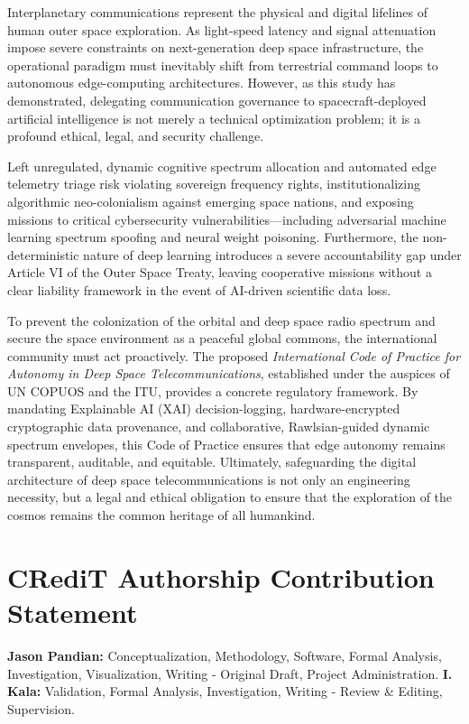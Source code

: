 \documentclass[final,5p,times,twocolumn]{elsarticle}
\begin{document}
Interplanetary communications represent the physical and digital lifelines of human outer space exploration. As light-speed latency and signal attenuation impose severe constraints on next-generation deep space infrastructure, the operational paradigm must inevitably shift from terrestrial command loops to autonomous edge-computing architectures. However, as this study has demonstrated, delegating communication governance to spacecraft-deployed artificial intelligence is not merely a technical optimization problem; it is a profound ethical, legal, and security challenge.

Left unregulated, dynamic cognitive spectrum allocation and automated edge telemetry triage risk violating sovereign frequency rights, institutionalizing algorithmic neo-colonialism against emerging space nations, and exposing missions to critical cybersecurity vulnerabilities—including adversarial machine learning spectrum spoofing and neural weight poisoning. Furthermore, the non-deterministic nature of deep learning introduces a severe accountability gap under Article VI of the Outer Space Treaty, leaving cooperative missions without a clear liability framework in the event of AI-driven scientific data loss.

To prevent the colonization of the orbital and deep space radio spectrum and secure the space environment as a peaceful global commons, the international community must act proactively. The proposed \textit{International Code of Practice for Autonomy in Deep Space Telecommunications}, established under the auspices of UN COPUOS and the ITU, provides a concrete regulatory framework. By mandating Explainable AI (XAI) decision-logging, hardware-encrypted cryptographic data provenance, and collaborative, Rawlsian-guided dynamic spectrum envelopes, this Code of Practice ensures that edge autonomy remains transparent, auditable, and equitable. Ultimately, safeguarding the digital architecture of deep space telecommunications is not only an engineering necessity, but a legal and ethical obligation to ensure that the exploration of the cosmos remains the common heritage of all humankind.

\section*{CRediT Authorship Contribution Statement}
\textbf{Jason Pandian:} Conceptualization, Methodology, Software, Formal Analysis, Investigation, Visualization, Writing - Original Draft, Project Administration. \textbf{I. Kala:} Validation, Formal Analysis, Investigation, Writing - Review \& Editing, Supervision.
\end{document}
